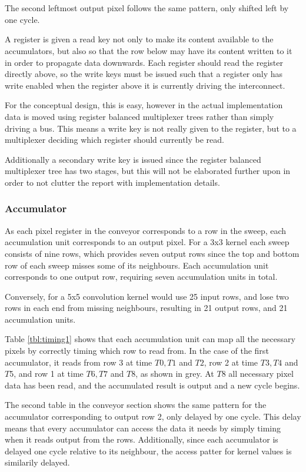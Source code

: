 \\ \\
The second leftmost output pixel follows the same pattern, only shifted left by one cycle.

A register is given a read key not only to make its content available to the accumulators, but also so that the row below may have its content written to it in order to propagate data downwards.
Each register should read the register directly above, so the write keys must be issued such that a register only has write enabled when the register above it is currently driving the interconnect.

For the conceptual design, this is easy, however in the actual implementation data is moved using register balanced multiplexer trees rather than simply driving a bus.
This means a write key is not really given to the register, but to a multiplexer deciding which register should currently be read.

Additionally a secondary write key is issued since the register balanced multiplexer tree has two stages, but this will not be elaborated further upon in order to not clutter the report with implementation details.

\subsubsection{Accumulator}
As each pixel register in the conveyor corresponds to a row in the sweep, each accumulation unit corresponds to an output pixel.
For a 3x3 kernel each sweep consists of nine rows, which provides seven output rows since the top and bottom row of each sweep misses some of its neighbours.
Each accumulation unit corresponds to one output row, requiring seven accumulation units in total.

Conversely, for a 5x5 convolution kernel would use 25 input rows, and lose two rows in each end from missing neighbours, resulting in 21 output rows, and 21 accumulation units.

Table \ref{tbl:timing1} shows that each accumulation unit can map all the necessary pixels by correctly timing which row to read from.
In the case of the first accumulator, it reads from row 3 at time $T0, T1$ and $T2$, row 2 at time $T3, T4$ and $T5$, and row 1 at time $T6, T7$ and $T8$, as shown in grey.
At $T8$ all necessary pixel data has been read, and the accumulated result is output and a new cycle begins.

The second table in the conveyor section shows the same pattern for the accumulator corresponding to output row 2, only delayed by one cycle.
This delay means that every accumulator can access the data it needs by simply timing when it reads output from the rows.
Additionally, since each accumulator is delayed one cycle relative to its neighbour, the access patter for kernel values is similarily delayed.

